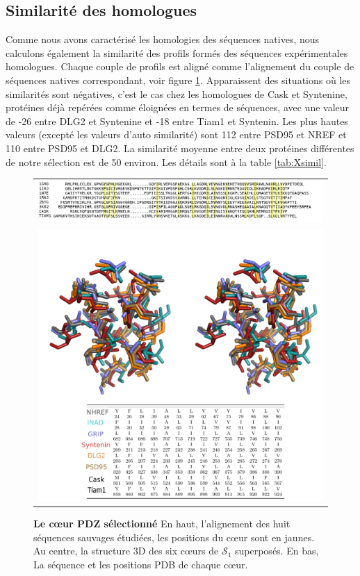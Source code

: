     \subsection{Similarité des homologues}

Comme nous avons caractérisé les homologies des séquences natives, nous calculons également la similarité des profils formés des séquences expérimentales homologues. Chaque couple de profils est aligné comme l'alignement du couple de séquences natives correspondant, voir figure \ref{fig:corePDZ}. Apparaissent des situations où les similarités sont négatives, c'est le cas chez les homologues de Cask et Syntenine, protéines déjà repérées comme éloignées en termes de séquences, avec une valeur de -26 entre DLG2 et Syntenine et -18 entre Tiam1  et Syntenin. Les plus hautes valeurs (excepté les valeurs d'auto similarité) sont  112 entre PSD95 et NREF et 110 entre PSD95 et DLG2. La similarité moyenne entre deux protéines différentes de notre sélection est de 50 environ. Les détails sont à la table \ref{tab:Xsimil}. 
    
    \begin{figure}[!htbp]
     \centering
     \begin{tabular}{c}
       \includegraphics[width=18cm]{images/natives_alignees.png} \\
       \includegraphics[width=16cm]{images/corePDZ2.png} \\
     \end{tabular}
     \caption{\textbf{Le cœur PDZ sélectionné} En haut, l'alignement des huit séquences sauvages étudiées, les positions du cœur sont en jaunes. Au centre, la structure 3D des six cœurs de $\mathcal{S}_1$ superposés. En bas, La séquence et les \og positions PDB \fg de chaque cœur.}
     \label{fig:corePDZ}      
    \end{figure}
    
